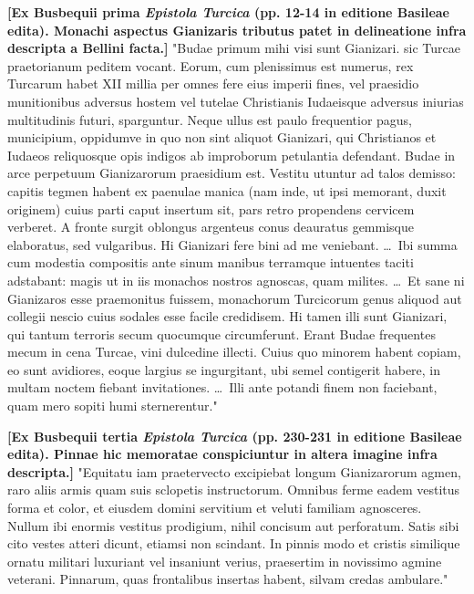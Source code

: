 \documentclass[12pt]{article}
\begin{document}
{		\vskip 12pt
		
		\noindent\textbf{[Ex Busbequii prima \textit{Epistola Turcica} (pp. 12-14 in editione Basileae edita). Monachi aspectus Gianizaris tributus patet in delineatione infra descripta a Bellini facta.]} "Budae primum mihi visi sunt Gianizari. sic Turcae praetorianum peditem vocant. Eorum, cum plenissimus est numerus, rex Turcarum habet XII millia per omnes fere eius imperii fines, vel praesidio munitionibus adversus hostem vel tutelae Christianis Iudaeisque adversus iniurias multitudinis futuri, sparguntur. Neque ullus est paulo frequentior pagus, municipium, oppidumve in quo non sint aliquot Gianizari, qui Christianos et Iudaeos reliquosque opis indigos ab improborum petulantia defendant. Budae in arce perpetuum Gianizarorum praesidium est. Vestitu utuntur ad talos demisso: capitis tegmen habent ex paenulae manica (nam inde, ut ipsi memorant, duxit originem) cuius parti caput insertum sit, pars retro propendens cervicem verberet. A fronte surgit oblongus argenteus conus deauratus gemmisque elaboratus, sed vulgaribus. Hi Gianizari fere bini ad me veniebant. \dots\ Ibi summa cum modestia compositis ante sinum manibus terramque intuentes taciti adstabant: magis ut in iis monachos nostros agnoscas, quam milites. \dots\ Et sane ni Gianizaros esse praemonitus fuissem, monachorum Turcicorum genus aliquod aut collegii nescio cuius sodales esse facile credidisem. Hi tamen illi sunt Gianizari, qui tantum terroris secum quocumque circumferunt. Erant Budae frequentes mecum in cena Turcae, vini dulcedine illecti. Cuius quo minorem habent copiam, eo sunt avidiores, eoque largius se ingurgitant, ubi semel contigerit habere, in multam noctem fiebant invitationes. \dots\ Illi ante potandi finem non faciebant, quam mero sopiti humi sternerentur."
		
		\vskip 12pt
		
		\noindent\textbf{[Ex Busbequii tertia \textit{Epistola Turcica} (pp. 230-231 in editione Basileae edita). Pinnae hic memoratae conspiciuntur in altera imagine infra descripta.]} "Equitatu iam praetervecto excipiebat longum Gianizarorum agmen, raro aliis armis quam suis sclopetis instructorum. Omnibus ferme eadem vestitus forma et color, et eiusdem domini servitium et veluti familiam agnosceres. Nullum ibi enormis vestitus prodigium, nihil concisum aut perforatum. Satis sibi cito vestes atteri dicunt, etiamsi non scindant. In pinnis modo et cristis similique ornatu militari luxuriant vel insaniunt verius, praesertim in novissimo agmine veterani. Pinnarum, quas frontalibus insertas habent, silvam credas ambulare."
		
}
\end{document}
